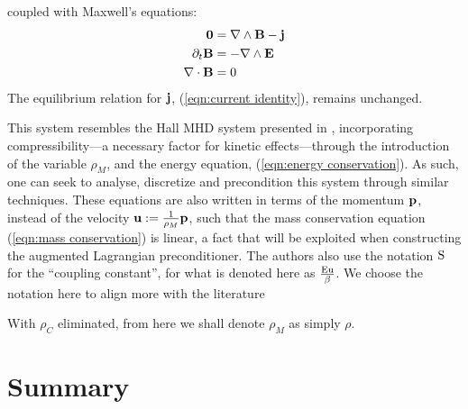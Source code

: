     coupled with Maxwell's equations:
    \begin{align}
        \mathbf{0}  &=  \nabla\wedge\mathbf{B} - \mathbf{j}  \label{eqn:Ampère's law}  \\
        \partial_{t}\mathbf{B}  &=  - \nabla\wedge\mathbf{E}  \label{eqn:Faraday's law}  \\
        \nabla\cdot\mathbf{B}  &=  0  \label{eqn:Gauss's law}
    \end{align}
    The equilibrium relation for $\mathbf{j}$, (\ref{eqn:current identity}), remains unchanged.

    This system resembles the Hall MHD system presented in \cite{LHF22}, incorporating compressibility—a necessary factor for kinetic effects—through the introduction of the variable $\rho_{M}$, and the energy equation, (\ref{eqn:energy conservation}). As such, one can seek to analyse, discretize and precondition this system through similar techniques. These equations are also written in terms of the momentum $\mathbf{p}$, instead of the velocity $\mathbf{u}  :=  \frac{1}{\rho_{M}}\mathbf{p}$, such that the mass conservation equation (\ref{eqn:mass conservation}) is linear, a fact that will be exploited when constructing the augmented Lagrangian preconditioner. The authors also use the notation $\mathrm{S}$ for the ``coupling constant'', for what is denoted here as $\frac{\mathrm{Eu}}{\beta}$. We choose the notation here to align more with the literature

    With $\rho_{C}$ eliminated, from here we shall denote $\rho_{M}$ as simply $\rho$.
    

    
    
    

    
    \section*{Summary}
    